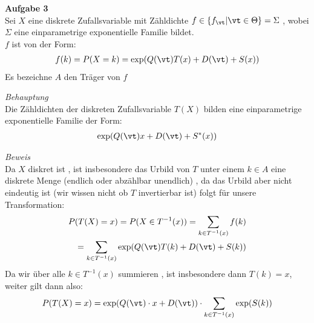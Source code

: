 \documentclass[12pt]{article}
\begin{document}
        \begin{description}
                         \item{\textbf{Aufgabe 3}\\
                                Sei $X$ eine diskrete Zufallsvariable mit Zähldichte $f\in\{f_{\vt}|\vt\in\Theta\}=\Sigma$ , wobei $\Sigma$ eine einparametrige exponentielle Familie bildet. 
                                \\ $f$ ist von der Form:
                                \begin{align*}
                                        f(k)=P(X=k)=\exp(Q(\vt)T(x)+D(\vt)+S(x))
                                \end{align*}
                                Es bezeichne $A$ den Träger von $f$
                                }
                                \item{\textit{Behauptung}\\
                                Die Zähldichten der diskreten Zufallsvariable $T(X)$ bilden eine einparametrige exponentielle Familie der Form:
                                \begin{align*}
                                        \exp(Q(\vt)x+D(\vt)+S^*(x))
                                \end{align*}
                                }
                                \item{\textit{Beweis}\\
                                Da $X$ diskret ist , ist insbesondere das Urbild von $T$ unter einem $k\in A$ eine diskrete Menge (endlich oder abzählbar unendlich) , da das Urbild aber nicht eindeutig ist (wir wissen nicht ob $T$ invertierbar ist) folgt für unsere Transformation: 
                                \begin{align*}
                                        P(T(X)=x)=P(X\in T^{-1}(x))=\sum_{k\in T^{-1}(x)}f(k) \\
                                        =\sum_{k\in T^{-1}(x)} \exp(Q(\vt)T(k)+D(\vt)+S(k))
                                \end{align*}
                                Da wir über alle $k\in T^{-1}(x)$ summieren , ist insbesondere dann $T(k)=x$, weiter gilt dann also:
                                \begin{align*}
                                        P(T(X)=x)=\exp(Q(\vt)\cdot x+D(\vt)) \cdot \sum_{k\in T^{-1}(x)}\exp(S(k))
                                \end{align*}
}
\end{description}
\end{document}
